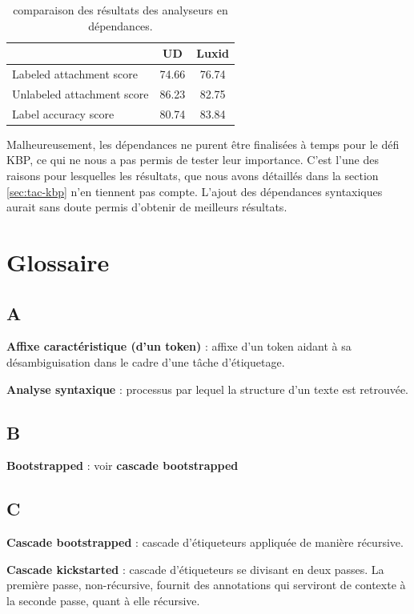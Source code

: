 \documentclass[12pt,a4paper,times,twoside,openright]{report}
\begin{document}
\begin{table}[ht!]
\centering
\begin{tabular}{|l|c|c|}
\cline{2-3}
\multicolumn{1}{l|}{}      & UD    & Luxid \\
\hline
Labeled attachment score   & 74.66 & 76.74 \\
Unlabeled attachment score & 86.23 & 82.75 \\
Label accuracy score       & 80.74 & 83.84 \\
\hline
\end{tabular}
\caption{comparaison des résultats des analyseurs en dépendances.}
\label{tab:dependencies-luxid-vs-UD}
\end{table}

Malheureusement, les dépendances ne purent être finalisées à temps pour le défi KBP, ce qui ne nous a pas permis de tester leur importance. C'est l'une des raisons pour lesquelles les résultats, que nous avons détaillés dans la section \ref{sec:tac-kbp} n'en tiennent pas compte. L'ajout des dépendances syntaxiques aurait sans doute permis d'obtenir de meilleurs résultats.



\chapter*{Glossaire}
\section*{A}
\textbf{Affixe caractéristique (d'un token)} : affixe d'un token aidant à sa désambiguisation dans le cadre d'une tâche d'étiquetage.

\textbf{Analyse syntaxique} : processus par lequel la structure d'un texte est retrouvée.

\section*{B}
\textbf{Bootstrapped} : voir \textbf{cascade bootstrapped}

\section*{C}
\textbf{Cascade bootstrapped} : cascade d'étiqueteurs appliquée de manière récursive.

\textbf{Cascade kickstarted} : cascade d'étiqueteurs se divisant en deux passes. La première passe, non-récursive, fournit des annotations qui serviront de contexte à la seconde passe, quant à elle récursive.
\end{document}
